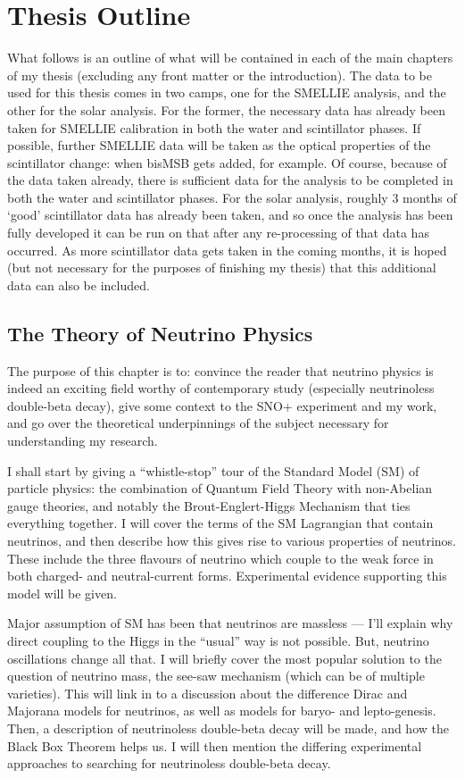 \section{Thesis Outline}\label{sect:thesis_outline}
What follows is an outline of what will be contained in each of the main chapters of my thesis (excluding any front matter or the introduction). The data to be used for this thesis comes in two camps, one for the SMELLIE analysis, and the other for the solar analysis. For the former, the necessary data has already been taken for SMELLIE calibration in both the water and scintillator phases. If possible, further SMELLIE data will be taken as the optical properties of the scintillator change: when bisMSB gets added, for example. Of course, because of the data taken already, there is sufficient data for the analysis to be completed in both the water and scintillator phases. For the solar analysis, roughly 3 months of `good' scintillator data has already been taken, and so once the analysis has been fully developed it can be run on that after any re-processing of that data has occurred. As more scintillator data gets taken in the coming months, it is hoped (but not necessary for the purposes of finishing my thesis) that this additional data can also be included.

\subsection{The Theory of Neutrino Physics}
The purpose of this chapter is to: convince the reader that neutrino physics is indeed an exciting field worthy of contemporary study (especially neutrinoless double-beta decay), give some context to the SNO+ experiment and my work, and go over the theoretical underpinnings of the subject necessary for understanding my research.

I shall start by giving a ``whistle-stop'' tour of the Standard Model (SM) of particle physics: the combination of Quantum Field Theory with non-Abelian gauge theories, and notably the Brout-Englert-Higgs Mechanism that ties everything together. I will cover the terms of the SM Lagrangian that contain neutrinos, and then describe how this gives rise to various properties of neutrinos. These include the three flavours of neutrino which couple to the weak force in both charged- and neutral-current forms. Experimental evidence supporting this model will be given.

Major assumption of SM has been that neutrinos are massless --- I'll explain why direct coupling to the Higgs in the ``usual'' way is not possible. But, neutrino oscillations change all that. I will briefly cover the most popular solution to the question of neutrino mass, the see-saw mechanism (which can be of multiple varieties). This will link in to a discussion about the difference Dirac and Majorana models for neutrinos, as well as models for baryo- and lepto-genesis. Then, a description of neutrinoless double-beta decay will be made, and how the Black Box Theorem helps us. I will then mention the differing experimental approaches to searching for neutrinoless double-beta decay.

